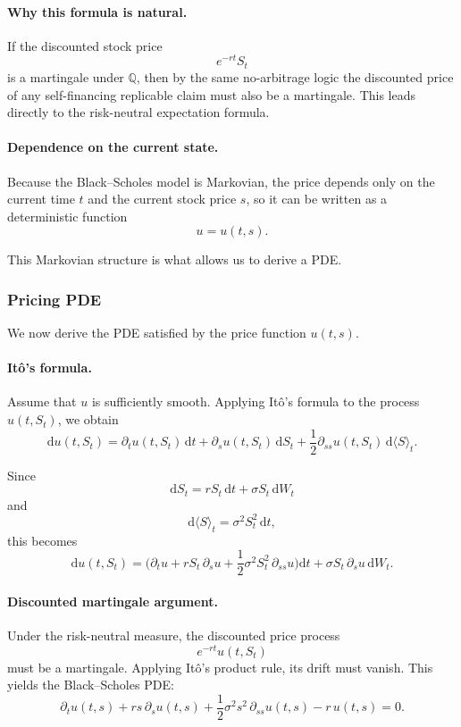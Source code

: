 \documentclass[11pt]{article}
\newcommand{\Qbb}{\mathbb{Q}}
\theoremstyle{plain}
\theoremstyle{definition}
\theoremstyle{remark}
\begin{document}
\paragraph{Why this formula is natural.}
If the discounted stock price
\[
e^{-rt}S_t
\]
is a martingale under \(\Qbb\), then by the same no-arbitrage logic the
discounted price of any self-financing replicable claim must also be a
martingale.
This leads directly to the risk-neutral expectation formula.

\paragraph{Dependence on the current state.}
Because the Black--Scholes model is Markovian, the price depends only on
the current time \(t\) and the current stock price \(s\), so it can be
written as a deterministic function
\[
u=u(t,s).
\]

This Markovian structure is what allows us to derive a PDE.

\subsubsection{Pricing PDE}

We now derive the PDE satisfied by the price function \(u(t,s)\).

\paragraph{It\^o's formula.}
Assume that \(u\) is sufficiently smooth.
Applying It\^o's formula to the process \(u(t,S_t)\), we obtain
\[
\mathrm{d}u(t,S_t)
=
\partial_t u(t,S_t)\,\mathrm{d}t
+
\partial_s u(t,S_t)\,\mathrm{d}S_t
+
\frac12 \partial_{ss}u(t,S_t)\,\mathrm{d}\langle S\rangle_t.
\]

Since
\[
\mathrm{d}S_t=rS_t\,\mathrm{d}t+\sigma S_t\,\mathrm{d}W_t
\]
and
\[
\mathrm{d}\langle S\rangle_t=\sigma^2 S_t^2\,\mathrm{d}t,
\]
this becomes
\[
\mathrm{d}u(t,S_t)
=
\Big(
\partial_t u
+
rS_t\,\partial_s u
+
\frac12 \sigma^2 S_t^2\,\partial_{ss}u
\Big)\mathrm{d}t
+
\sigma S_t\,\partial_s u\,\mathrm{d}W_t.
\]

\paragraph{Discounted martingale argument.}
Under the risk-neutral measure, the discounted price process
\[
e^{-rt}u(t,S_t)
\]
must be a martingale.
Applying It\^o's product rule, its drift must vanish.
This yields the Black--Scholes PDE:
\[
\boxed{
\partial_t u(t,s)
+
rs\,\partial_s u(t,s)
+
\frac12 \sigma^2 s^2\,\partial_{ss}u(t,s)
-
r\,u(t,s)
=
0.
}
\]
\end{document}

